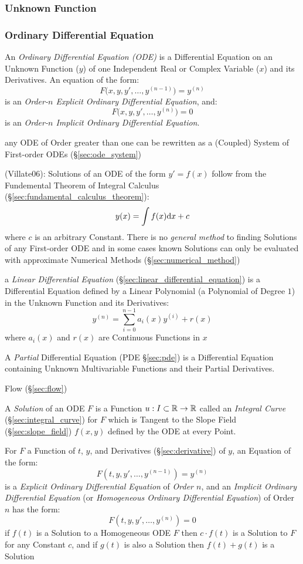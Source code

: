 {\subsubsection{Unknown Function}\label{sec:unknown_function}

\subsubsection{Ordinary Differential Equation}\label{sec:ode}

An \emph{Ordinary Differential Equation (ODE)} is a Differential Equation on an
Unknown Function ($y$) of one Independent Real or Complex Variable ($x$) and its
Derivatives. An equation of the form:
\[
  F\Big(x,y,y',\ldots,y^{(n-1)}\Big) = y^{(n)}
\]
is an \emph{Order-$n$ Explicit Ordinary Differential Equation}, and:
\[
  F\Big(x,y,y',\ldots,y^{(n)}\Big) = 0
\]
is an \emph{Order-$n$ Implicit Ordinary Differential Equation}.

any ODE of Order greater than one can be rewritten as a (Coupled) System of
First-order ODEs (\S\ref{sec:ode_system})

(Villate06): Solutions of an ODE of the form $y' = f(x)$ follow from the
Fundemental Theorem of Integral Calculus
(\S\ref{sec:fundamental_calculus_theorem}):
\[
y(x) = \int f(x) \mathrm{d}x + c
\]
where $c$ is an arbitrary Constant. There is no \emph{general method} to finding
Solutions of any First-order ODE and in some cases known Solutions can only be
evaluated with approximate Numerical Methods (\S\ref{sec:numerical_method})

\fist a \emph{Linear Differential Equation}
(\S\ref{sec:linear_differential_equation}) is a Differential Equation defined
by a Linear Polynomial (a Polynomial of Degree $1$) in the Unknown Function and
its Derivatives:
\[
  y^{(n)} = \sum_{i=0}^{n-1} a_i (x) y^{(i)} + r(x)
\]
where $a_i(x)$ and $r(x)$ are Continuous Functions in $x$

\fist A \emph{Partial} Differential Equation (PDE
\S\ref{sec:pde}) is a Differential Equation
containing Unknown Multivariable Functions and their Partial Derivatives.

\fist Flow (\S\ref{sec:flow})

A \emph{Solution} of an ODE $F$ is a Function $u : I \subset \mathbb{R} \rightarrow
\mathbb{R}$ called an \emph{Integral Curve} (\S\ref{sec:integral_curve}) for $F$
which is Tangent to the Slope Field (\S\ref{sec:slope_field}) $f(x,y)$ defined
by the ODE at every Point.

For $F$ a Function of $t$, $y$, and Derivatives (\S\ref{sec:derivative}) of
$y$, an Equation of the form:
\[
  F(t,y,y',\ldots,y^{(n-1)}) = y^{(n)}
\]
is a \emph{Explicit Ordinary Differential Equation} of \emph{Order $n$}, and an
\emph{Implicit Ordinary Differential Equation} (or \emph{Homogeneous Ordinary
  Differential Equation}) of Order $n$ has the form:
\[
  F(t,y,y',\ldots,y^{(n)}) = 0
\]
if $f(t)$ is a Solution to a Homogeneous ODE $F$ then $c\cdot{f(t)}$ is a
Solution to $F$ for any Constant $c$, and if $g(t)$ is also a Solution then
$f(t) + g(t)$ is a Solution


}
